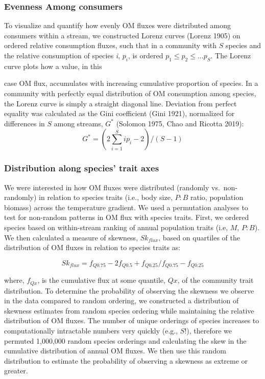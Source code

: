 \documentclass[
]{article}
\begin{document}
\hypertarget{evenness-among-consumers}{%
\subsubsection{Evenness Among
consumers}\label{evenness-among-consumers}}

To visualize and quantify how evenly OM fluxes were distributed among
consumers within a stream, we constructed Lorenz curves (Lorenz 1905) on
ordered relative consumption fluxes, such that in a community with \(S\)
species and the relative consumption of species \emph{i}, \(p_i\), is
ordered \(p_1 \leq p_2 \leq ... p_S\). The Lorenz curve plots how a
value, in this

case OM flux, accumulates with increasing cumulative proportion of
species. In a community with perfectly equal distribution of OM
consumption among species, the Lorenz curve is simply a straight
diagonal line. Deviation from perfect equality was calculated as the
Gini coefficient (Gini 1921), normalized for differences in \(S\) among
streams, \(G^*\) (Solomon 1975, Chao and Ricotta 2019):
\[ G^* = (2 \sum_{i = 1}^S ip_i -2)/(S-1)\]

\hypertarget{distribution-along-species-trait-axes}{%
\subsubsection{Distribution along species' trait
axes}\label{distribution-along-species-trait-axes}}

We were interested in how OM fluxes were distributed (randomly
vs.~non-randomly) in relation to species traits (i.e., body size,
\(P:B\) ratio, population biomass) across the temperature gradient. We
used a permutation analyses to test for non-random patterns in OM flux
with species traits. First, we ordered species based on within-stream
ranking of annual population traits (i.e, \(M\), \(P:B\)). We then
calculated a measure of skewness, \(Sk_{flux}\), based on quartiles of
the distribution of OM fluxes in relation to species traits as:

\[Sk_{flux} = f_{Q0.75} - 2f_{Q0.5} + f_{Q0.25}/ f_{Q0.75}-f_{Q0.25}\]

where, \(f_{Qx}\), is the cumulative flux at some quantile, \(Qx\), of
the community trait distribution. To determine the probability of
observing the skewness we observe in the data compared to random
ordering, we constructed a distribution of skewness estimates from
random species ordering while maintaining the relative distribution of
OM fluxes. The number of unique orderings of species increases to
computationally intractable numbers very quickly (e.g., \(S!\)),
therefore we permuted 1,000,000 random species orderings and calculating
the skew in the cumulative distribution of annual OM fluxes. We then use
this random distribution to estimate the probability of observing a
skewness as extreme or greater.
\end{document}
